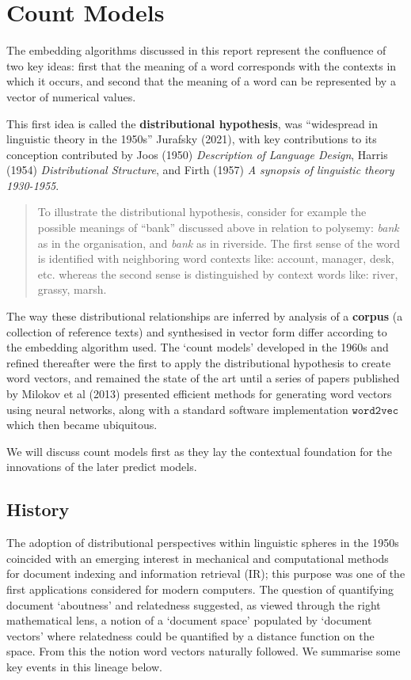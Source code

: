 \section{Count Models}
The embedding algorithms discussed in this report represent the confluence of two key ideas: first that the meaning of a word corresponds with the contexts in which it occurs, and second that the meaning of a word can be represented by a vector of numerical values.

This first idea is called the \textbf{distributional hypothesis}, was ``widespread in linguistic theory in the 1950s'' Jurafsky (2021), with key contributions to its conception contributed by Joos (1950) \emph{Description of Language Design}, Harris (1954) \emph{Distributional Structure}, and Firth (1957) \emph{A synopsis of linguistic theory 1930-1955}.

\begin{quote}
To illustrate the distributional hypothesis, consider for example the possible meanings of ``bank'' discussed above in relation to polysemy: \emph{bank} as in the organisation, and \emph{bank} as in riverside. The first sense of the word is identified with neighboring word contexts like: account, manager, desk, etc. whereas the second sense is distinguished by context words like: river, grassy, marsh.
\end{quote}

The way these distributional relationships are inferred by analysis of a \textbf{corpus} (a collection of reference texts) and synthesised in vector form differ according to the embedding algorithm used. The `count models' developed in the 1960s and refined thereafter were the first to apply the distributional hypothesis to create word vectors, and remained the state of the art until a series of papers published by Milokov et al (2013) presented efficient methods for generating word vectors using neural networks, along with a standard software implementation $\texttt{word2vec}$ which then became ubiquitous.

We will discuss count models first as they lay the contextual foundation for the innovations of the later predict models.
\subsection{History}
The adoption of distributional perspectives within linguistic spheres in the 1950s coincided with an emerging interest in mechanical and computational methods for document indexing and information retrieval (IR); this purpose was one of the first applications considered for modern computers. The question of quantifying document `aboutness' and relatedness suggested, as viewed through the right mathematical lens, a notion of a `document space' populated by `document vectors' where relatedness could be quantified by a distance function on the space. From this the notion word vectors naturally followed. We summarise some key events in this lineage below.

